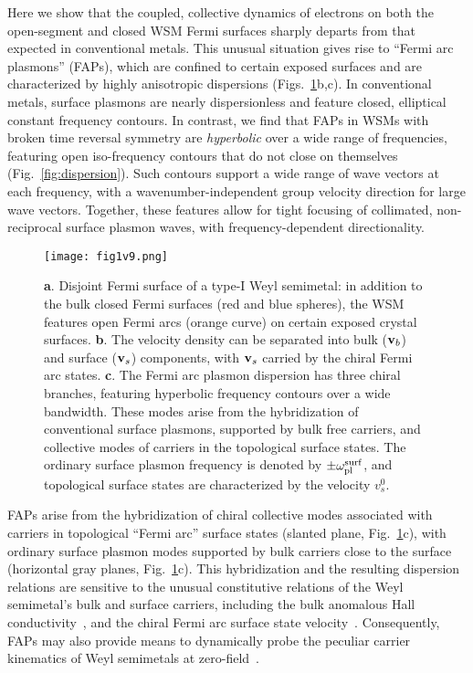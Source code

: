 \documentclass[aps,twocolumn,prl,groupedaddress]{revtex4}
\renewcommand{\vec}[1]{{\bf #1}}
\begin{document}
Here we show that the coupled, collective dynamics of electrons on both the open-segment and closed WSM Fermi surfaces sharply departs from that expected in conventional metals. 
This unusual situation gives rise to ``Fermi arc plasmons'' (FAPs), which are confined to certain exposed surfaces and are characterized by highly anisotropic dispersions
(Figs.~\ref{fig:summary}b,c).  
In conventional metals, surface plasmons are nearly dispersionless and feature closed, elliptical constant frequency contours.
In contrast, we find that FAPs in WSMs with broken time reversal symmetry
are 
{\it hyperbolic} over a wide range of frequencies, featuring open 
iso-frequency contours that do not close on themselves (Fig.~\ref{fig:dispersion}). 
Such 
contours support a wide range of wave vectors at each frequency, with a wavenumber-independent group velocity direction for large wave vectors. 
Together, these features allow for tight focusing of 
collimated, non-reciprocal surface plasmon waves, with frequency-dependent directionality.

\begin{figure}[t]
\texttt{[image: fig1v9.png]}
\caption{{\bf a}. Disjoint Fermi surface of a type-I Weyl semimetal: in addition to the bulk 
closed Fermi surfaces (red and blue spheres), the WSM features open Fermi arcs (orange curve) on  
certain exposed crystal surfaces. 
{\bf b}. The velocity density can be separated into bulk ($\vec v_b$) and surface ($\vec v_s$) components, with $\vec v_s$ 
carried by the chiral Fermi arc states. 
{\bf c}. The Fermi arc plasmon dispersion has three chiral branches, featuring hyperbolic frequency contours over a wide bandwidth.
These modes arise from the hybridization of conventional surface plasmons, supported by bulk free carriers, and collective modes of carriers in the topological surface states.
The ordinary surface plasmon frequency is denoted by $\pm\omega_{\rm pl}^{\rm surf}$, and topological surface states are characterized by the velocity $v_s^0$.}\label{fig:summary}
\end{figure}


FAPs arise from the hybridization of chiral collective modes associated with carriers in topological ``Fermi arc'' surface states (slanted plane, Fig.~\ref{fig:summary}c), 
with ordinary surface plasmon modes supported by bulk carriers close to the surface (horizontal gray planes, Fig.~\ref{fig:summary}c).
This hybridization and the resulting dispersion relations 
are sensitive to the unusual constitutive relations of the Weyl semimetal's bulk and surface carriers, including the bulk  
anomalous Hall conductivity~\cite{burkov}, and the chiral Fermi arc surface state velocity~\cite{wan,yingran,balents}. 
Consequently, FAPs  
may also provide means to dynamically probe the peculiar carrier kinematics of Weyl semimetals at zero-field~\cite{burkov,son}.  
\end{document}
